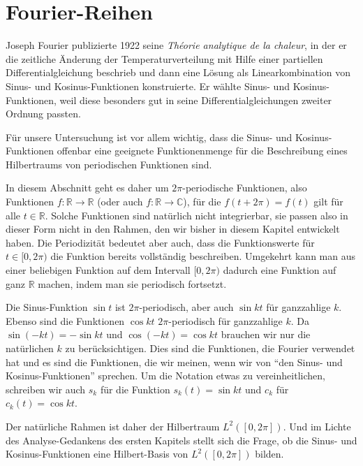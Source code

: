%
%
%
\section{Fourier-Reihen
\label{section:fourier-reihen}}
Joseph Fourier publizierte 1922 seine {\em Théorie analytique de la chaleur},
in der er die zeitliche Änderung der Temperaturverteilung mit Hilfe einer
partiellen Differentialgleichung beschrieb und dann eine Lösung als
Linearkombination von Sinus- und Kosinus-Funktionen konstruierte. 
Er wählte Sinus- und Kosinus-Funktionen, weil diese besonders gut in
seine Differentialgleichungen zweiter Ordnung passten.

Für unsere Untersuchung ist vor allem wichtig, dass die Sinus- und
Kosinus-Funktionen offenbar eine geeignete Funktionenmenge für die
Beschreibung eines Hilbertraums von periodischen Funktionen sind.

In diesem Abschnitt geht es daher um $2\pi$-periodische Funktionen,
also Funktionen $f\colon \mathbb R\to \mathbb R$ (oder auch
$f\colon\mathbb R\to \mathbb C$),
für die $f(t+2\pi)= f(t)$ gilt für alle $t\in\mathbb R$.  
Solche Funktionen sind natürlich nicht integrierbar, sie passen also
in dieser Form nicht in den Rahmen, den wir bisher in diesem Kapitel
entwickelt haben.
Die Periodizität bedeutet aber auch, dass die Funktionswerte für
$t\in[0,2\pi)$ die Funktion bereits vollständig beschreiben.
Umgekehrt kann man aus einer beliebigen Funktion auf dem Intervall
$[0,2\pi)$ dadurch eine Funktion auf ganz $\mathbb R$ machen, indem
man sie periodisch fortsetzt.

Die Sinus-Funktion $\sin t$ ist $2\pi$-periodisch, aber auch 
$\sin kt$ für ganzzahlige $k$.
Ebenso sind die Funktionen $\cos kt$ $2\pi$-periodisch für ganzzahlige $k$.
Da $\sin(-kt)=-\sin kt$ und $\cos(-kt)=\cos kt$ brauchen wir nur die
natürlichen $k$ zu berücksichtigen.
Dies sind die Funktionen, die Fourier verwendet hat und es sind die
Funktionen, die wir meinen, wenn wir von ``den Sinus- und Kosinus-Funktionen''
sprechen.
Um die Notation etwas zu vereinheitlichen, schreiben wir auch $s_k$ für
die Funktion $s_k(t)=\sin kt$ und $c_k$ für $c_k(t)=\cos kt$.

Der natürliche Rahmen ist daher der Hilbertraum $L^2([0,2\pi])$.
Und im Lichte des Analyse-Gedankens des ersten Kapitels stellt sich
die Frage, ob die Sinus- und Kosinus-Funktionen eine Hilbert-Basis
von $L^2([0,2\pi])$ bilden.


